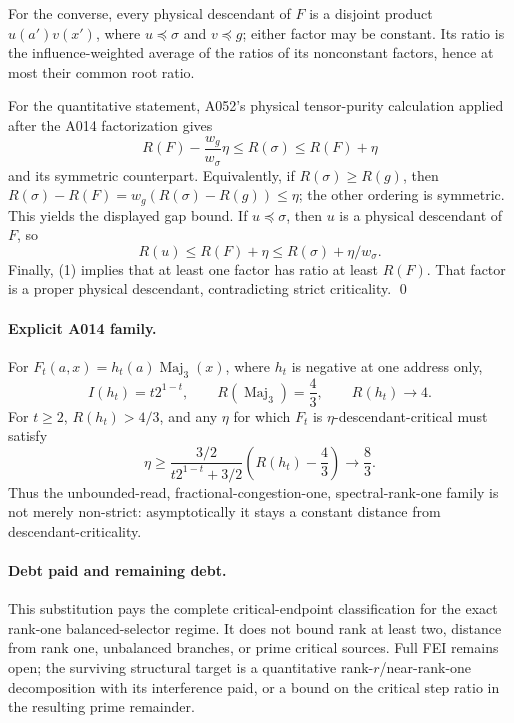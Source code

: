 For the converse, every physical descendant of $F$ is a disjoint product
$u(a')v(x')$, where $u\preceq\sigma$ and $v\preceq g$; either factor may be
constant.  Its ratio is the influence-weighted average of the ratios of its
nonconstant factors, hence at most their common root ratio.

For the quantitative statement, A052's physical tensor-purity calculation
applied after the A014 factorization gives
\[
 R(F)-\frac{w_g}{w_\sigma}\eta\le R(\sigma)\le R(F)+\eta
\]
and its symmetric counterpart.  Equivalently, if
$R(\sigma)\ge R(g)$, then
$R(\sigma)-R(F)=w_g(R(\sigma)-R(g))\le\eta$;
the other ordering is symmetric.  This yields the displayed gap bound.  If
$u\preceq\sigma$, then $u$ is a physical descendant of $F$, so
\[
 R(u)\le R(F)+\eta
       \le R(\sigma)+\eta/w_\sigma.
\]
Finally, (1) implies that at least one factor has ratio at least $R(F)$.
That factor is a proper physical descendant, contradicting strict
criticality. \qed

\paragraph{Explicit A014 family.}
For $F_t(a,x)=h_t(a)\operatorname{Maj}_3(x)$, where $h_t$ is negative at
one address only,
\[
 I(h_t)=t2^{1-t},\qquad R(\operatorname{Maj}_3)=\frac43,
 \qquad R(h_t)\longrightarrow4.
\]
For $t\ge2$, $R(h_t)>4/3$, and any $\eta$ for which $F_t$ is
$\eta$-descendant-critical must satisfy
\[
 \eta\ge
 \frac{3/2}{t2^{1-t}+3/2}\left(R(h_t)-\frac43\right)
 \longrightarrow\frac83.
\]
Thus the unbounded-read, fractional-congestion-one, spectral-rank-one family
is not merely non-strict: asymptotically it stays a constant distance from
descendant-criticality.

\paragraph{Debt paid and remaining debt.}
This substitution pays the complete critical-endpoint classification for
the exact rank-one balanced-selector regime.  It does not bound rank at least
two, distance from rank one, unbalanced branches, or prime critical sources.
Full FEI remains open; the surviving structural target is a quantitative
rank-$r$/near-rank-one decomposition with its interference paid, or a bound
on the critical step ratio in the resulting prime remainder.

